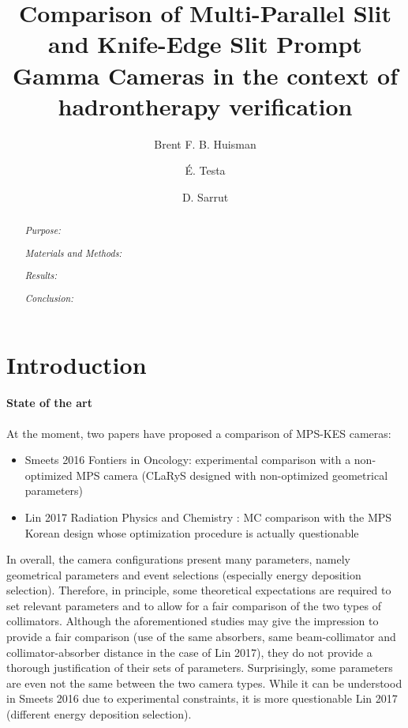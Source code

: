 \documentclass[a4paper,english]{article}
\begin{document}
\title{Comparison of Multi-Parallel Slit and Knife-Edge Slit Prompt Gamma Cameras in the context of hadrontherapy verification}

\author[1,2]{Brent F. B. Huisman}
\author[2]{É. Testa}
\author[1]{D. Sarrut}

\maketitle

\begin{abstract}

\emph{Purpose:} 

\emph{Materials and Methods:} 

\emph{Results:} 

\emph{Conclusion:} 

\end{abstract}


\section{Introduction}

\paragraph{State of the art} At the moment, two papers have proposed a comparison of MPS-KES cameras:
\begin{itemize}
	\item Smeets 2016 Fontiers in Oncology: experimental comparison with a non-optimized MPS camera (CLaRyS designed with non-optimized geometrical parameters)
    \item Lin 2017 Radiation Physics and Chemistry : MC comparison with the MPS Korean design whose optimization procedure is actually questionable
\end{itemize}
In overall, the camera configurations present many parameters, namely geometrical parameters and event selections (especially energy deposition selection). Therefore, in principle, some theoretical expectations are required to set relevant parameters and to allow for a fair comparison of the two types of collimators. Although the aforementioned studies may give the impression to provide a fair comparison (use of the same absorbers, same beam-collimator and collimator-absorber distance in the case of Lin 2017), they do not provide a thorough justification of their sets of parameters. Surprisingly, some parameters are even not the same between the two camera types. While it can be understood in Smeets 2016 due to experimental constraints, it is more questionable Lin 2017 (different energy deposition selection).
\end{document}
